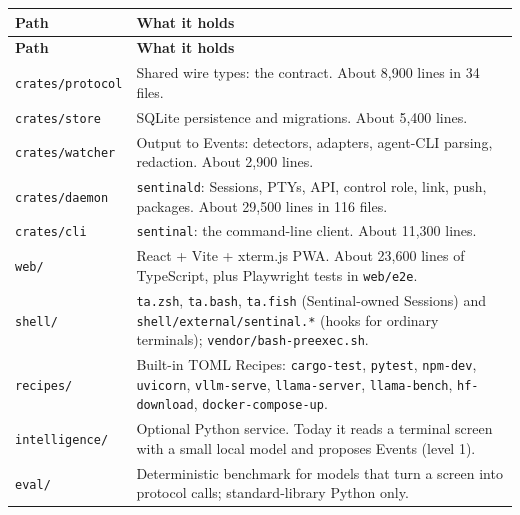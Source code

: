 \begin{small}
\begin{longtable}{>{\raggedright\arraybackslash}p{0.479\dimexpr \linewidth-4\tabcolsep\relax}>{\raggedright\arraybackslash}p{0.521\dimexpr \linewidth-4\tabcolsep\relax}}
\toprule
\textbf{Path} & \textbf{What it holds} \\
\midrule
\endfirsthead
\toprule
\textbf{Path} & \textbf{What it holds} \\
\midrule
\endhead
\texttt{crates/\allowbreak{}protocol} & Shared wire types: the contract. About 8,900 lines in 34 files. \\
\texttt{crates/\allowbreak{}store} & SQLite persistence and migrations. About 5,400 lines. \\
\texttt{crates/\allowbreak{}watcher} & Output to Events: detectors, adapters, agent-CLI parsing, redaction. About 2,900 lines. \\
\texttt{crates/\allowbreak{}daemon} & \texttt{sentinald}: Sessions, PTYs, API, control role, link, push, packages. About 29,500 lines in 116 files. \\
\texttt{crates/\allowbreak{}cli} & \texttt{sentinal}: the command-line client. About 11,300 lines. \\
\texttt{web/\allowbreak{}} & React + Vite + xterm.js PWA. About 23,600 lines of TypeScript, plus Playwright tests in \texttt{web/\allowbreak{}e2e}. \\
\texttt{shell/\allowbreak{}} & \texttt{ta.\allowbreak{}zsh}, \texttt{ta.\allowbreak{}bash}, \texttt{ta.\allowbreak{}fish} (Sentinal-owned Sessions) and \texttt{shell/\allowbreak{}external/\allowbreak{}sentinal.\allowbreak{}*} (hooks for ordinary terminals); \texttt{vendor/\allowbreak{}bash-{}\allowbreak{}preexec.\allowbreak{}sh}. \\
\texttt{recipes/\allowbreak{}} & Built-in TOML Recipes: \texttt{cargo-{}\allowbreak{}test}, \texttt{pytest}, \texttt{npm-{}\allowbreak{}dev}, \texttt{uvicorn}, \texttt{vllm-{}\allowbreak{}serve}, \texttt{llama-{}\allowbreak{}server}, \texttt{llama-{}\allowbreak{}bench}, \texttt{hf-{}\allowbreak{}download}, \texttt{docker-{}\allowbreak{}compose-{}\allowbreak{}up}. \\
\texttt{intelligence/\allowbreak{}} & Optional Python service. Today it reads a terminal screen with a small local model and proposes Events (level 1). \\
\texttt{eval/\allowbreak{}} & Deterministic benchmark for models that turn a screen into protocol calls; standard-library Python only. \\

\end{longtable}
\end{small}
